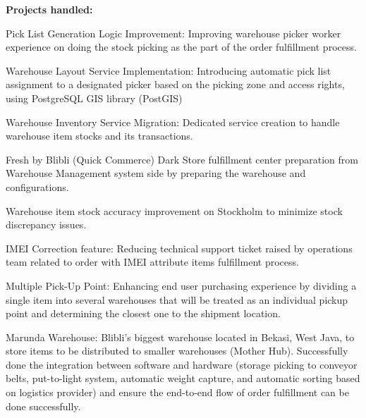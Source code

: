 \begin{cventries}
{\begin{cvitems}
{\begin{cvsubitems}
          \end{cvsubitems}
        }
        \item {\textbf{Projects handled:}
          \begin{cvsubitems}
            \item {Pick List Generation Logic Improvement: Improving warehouse picker worker experience on doing the stock picking as the part of the order fulfillment process.}
            \item {Warehouse Layout Service Implementation: Introducing automatic pick list assignment to a designated picker based on the picking zone and access rights, using PostgreSQL GIS library (PostGIS)}
            \item {Warehouse Inventory Service Migration: Dedicated service creation to handle warehouse item stocks and its transactions.}
            \item {Fresh by Blibli (Quick Commerce) Dark Store fulfillment center preparation from Warehouse Management system side by preparing the warehouse and configurations.}
            \item {Warehouse item stock accuracy improvement on Stockholm to minimize stock discrepancy issues.}
            \item {IMEI Correction feature: Reducing technical support ticket raised by operations team related to order with IMEI attribute items fulfillment process.}
            \item {Multiple Pick-Up Point: Enhancing end user purchasing experience by dividing a single item into several warehouses that will be treated as an individual pickup point and determining the closest one to the shipment location.}
            \item {Marunda Warehouse: Blibli's biggest warehouse located in Bekasi, West Java, to store items to be distributed to smaller warehouses (Mother Hub). Successfully done the integration between software and hardware (storage picking to conveyor belts, put-to-light system, automatic weight capture, and automatic sorting based on logistics provider) and ensure the end-to-end flow of order fulfillment can be done successfully.}
          \end{cvsubitems}
        }
      \end{cvitems}
    }


\end{cventries}
